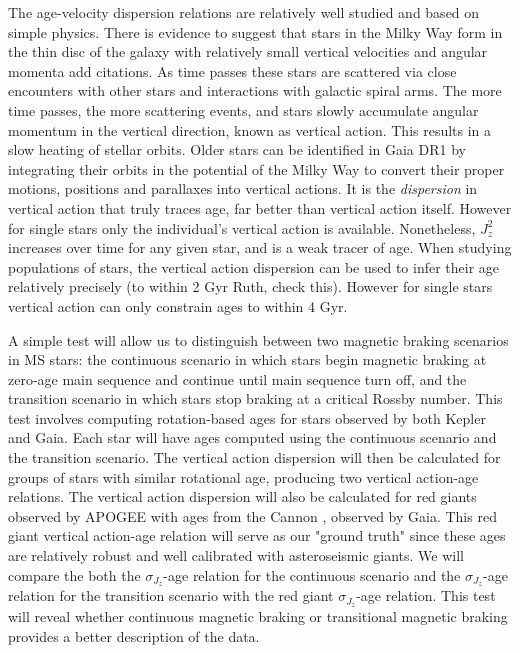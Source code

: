 \documentclass[12pt]{article}
\newcommand{\racomment}[1]{{\color{red}#1}}
\begin{document}
The age-velocity dispersion relations are relatively well studied and based on
simple physics.
There is evidence to suggest that stars in the Milky Way form in the thin disc
of the galaxy with relatively small vertical velocities and angular momenta
\racomment{add citations}.
As time passes these stars are scattered via close encounters with other
stars and interactions with galactic spiral arms.
The more time passes, the more scattering events, and stars slowly accumulate
angular momentum in the vertical direction, known as vertical action.
This results in a slow heating of stellar orbits.
Older stars can be identified in Gaia DR1 by integrating their orbits in the
potential of the Milky Way to convert their proper motions, positions and
parallaxes into vertical actions.
It is the {\it dispersion} in vertical action that truly traces age, far
better than vertical action itself.
However for single stars only the individual's vertical action is available.
Nonetheless, $J_z^2$ increases over time for any given star, and is a weak
tracer of age.
When studying populations of stars, the vertical action dispersion can be used
to infer their age relatively precisely (to within 2 Gyr
\racomment{Ruth, check this}).
However for single stars vertical action can only constrain ages to within 4
Gyr.

A simple test will allow us to distinguish between two magnetic braking
scenarios in MS stars: the continuous scenario in which stars begin magnetic
braking at zero-age main sequence and continue until main sequence turn off,
and the transition scenario in which stars stop braking at a critical Rossby
number.
This test involves computing rotation-based ages for stars observed by both
Kepler and Gaia.
Each star will have ages computed using the continuous scenario and the
transition scenario.
The vertical action dispersion will then be calculated for groups of stars
with similar rotational age, producing two vertical action-age relations.
The vertical action dispersion will also be calculated for red giants observed
by APOGEE with ages from the Cannon \citep{Ness2015}, observed by Gaia.
This red giant vertical action-age relation will serve as our "ground truth"
since these ages are relatively robust and well calibrated with asteroseismic
giants.
We will compare the both the $\sigma_{J_z}$-age relation for the continuous
scenario and the $\sigma_{J_z}$-age relation for the transition scenario with
the red giant $\sigma_{J_z}$-age relation.
This test will reveal whether continuous magnetic braking or transitional
magnetic braking provides a better description of the data.
\end{document}
